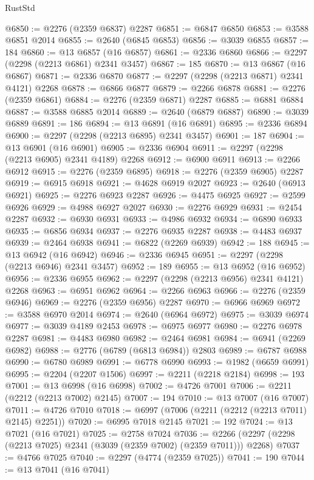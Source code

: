 \begin{lexlean}{RustStd}
\begin{coremodule}
{\begin{coremodule}
{{{{{{{{{{{{{{{{{{{{{{{{{{{{{{{{{{{{{{{{{{{{{{{{{{{{{{@6850 := @2276 (@2359 @6837) @2287
@6851 := @6847 @6850
@6853 := @3588 @6851 @2014
@6855 := @2640 (@6845 @6853)
@6856 := @3039 @6855
@6857 := 184
@6860 := @13 @6857 (@16 @6857)
@6861 := @2336 @6860
@6866 := @2297 (@2298 (@2213 @6861) @2341 @3457)
@6867 := 185
@6870 := @13 @6867 (@16 @6867)
@6871 := @2336 @6870
@6877 := @2297 (@2298 (@2213 @6871) @2341 @4121) @2268
@6878 := @6866 @6877
@6879 := @2266 @6878
@6881 := @2276 (@2359 @6861)
@6884 := @2276 (@2359 @6871) @2287
@6885 := @6881 @6884
@6887 := @3588 @6885 @2014
@6889 := @2640 (@6879 @6887)
@6890 := @3039 @6889
@6891 := 186
@6894 := @13 @6891 (@16 @6891)
@6895 := @2336 @6894
@6900 := @2297 (@2298 (@2213 @6895) @2341 @3457)
@6901 := 187
@6904 := @13 @6901 (@16 @6901)
@6905 := @2336 @6904
@6911 := @2297 (@2298 (@2213 @6905) @2341 @4189) @2268
@6912 := @6900 @6911
@6913 := @2266 @6912
@6915 := @2276 (@2359 @6895)
@6918 := @2276 (@2359 @6905) @2287
@6919 := @6915 @6918
@6921 := @4628 @6919 @2027
@6923 := @2640 (@6913 @6921)
@6925 := @2276 @6923 @2287
@6926 := @4475 @6925
@6927 := @2599 @6926
@6929 := @4988 @6927 @2027
@6930 := @2276 @6929
@6931 := @2454 @2287
@6932 := @6930 @6931
@6933 := @4986 @6932
@6934 := @6890 @6933
@6935 := @6856 @6934
@6937 := @2276 @6935 @2287
@6938 := @4483 @6937
@6939 := @2464 @6938
@6941 := @6822 (@2269 @6939)
@6942 := 188
@6945 := @13 @6942 (@16 @6942)
@6946 := @2336 @6945
@6951 := @2297 (@2298 (@2213 @6946) @2341 @3457)
@6952 := 189
@6955 := @13 @6952 (@16 @6952)
@6956 := @2336 @6955
@6962 := @2297 (@2298 (@2213 @6956) @2341 @4121) @2268
@6963 := @6951 @6962
@6964 := @2266 @6963
@6966 := @2276 (@2359 @6946)
@6969 := @2276 (@2359 @6956) @2287
@6970 := @6966 @6969
@6972 := @3588 @6970 @2014
@6974 := @2640 (@6964 @6972)
@6975 := @3039 @6974
@6977 := @3039 @4189 @2453
@6978 := @6975 @6977
@6980 := @2276 @6978 @2287
@6981 := @4483 @6980
@6982 := @2464 @6981
@6984 := @6941 (@2269 @6982)
@6988 := @2776 (@6789 (@6813 @6984)) @2803
@6989 := @6787 @6988
@6990 := @6780 @6989
@6991 := @6778 @6990
@6993 := @1982 (@6659 @6991)
@6995 := @2204 (@2207 @1506)
@6997 := @2211 (@2218 @2184)
@6998 := 193
@7001 := @13 @6998 (@16 @6998)
@7002 := @4726 @7001
@7006 := @2211 (@2212 (@2213 @7002) @2145)
@7007 := 194
@7010 := @13 @7007 (@16 @7007)
@7011 := @4726 @7010
@7018 := @6997 (@7006 (@2211 (@2212 (@2213 @7011) @2145) @2251))
@7020 := @6995 @7018 @2145
@7021 := 192
@7024 := @13 @7021 (@16 @7021)
@7025 := @2758 @7024
@7036 := @2266 (@2297 (@2298 (@2213 @7025) @2341 (@3039 (@2359 @7002) (@2359 @7011))) @2268)
@7037 := @4766 @7025
@7040 := @2297 (@4774 (@2359 @7025))
@7041 := 190
@7044 := @13 @7041 (@16 @7041)
}}}}}}}}}}}}}}}}}}}}}}}}}}}}}}}}}}}}}}}}}}}}}}}}}}}}}}
\end{coremodule}}
\end{coremodule}
\end{lexlean}
